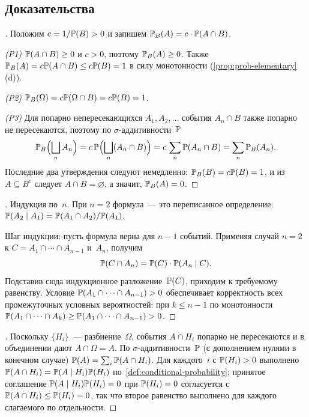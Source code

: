 \subsection*{Доказательства}

\begin{proof}[]
Положим $c = 1/\mathbb{P}(B) > 0$ и запишем $\mathbb{P}_B(A) = c \cdot \mathbb{P}(A \cap B)$.

\emph{(P1)} $\mathbb{P}(A \cap B) \geq 0$ и $c > 0$, поэтому $\mathbb{P}_B(A) \geq 0$. Также $\mathbb{P}_B(A) = c \mathbb{P}(A \cap B) \leq c \mathbb{P}(B) = 1$ в силу монотонности (\cref{prop:prob-elementary}\,(d)).

\emph{(P2)} $\mathbb{P}_B(\Omega) = c \mathbb{P}(\Omega \cap B) = c \mathbb{P}(B) = 1$.

\emph{(P3)} Для попарно непересекающихся $A_1, A_2, \dots$ события $A_n \cap B$ также попарно не пересекаются, поэтому по $\sigma$-аддитивности~$\mathbb{P}$
\[
  \mathbb{P}_B\Bigl(\bigsqcup_n A_n\Bigr) = c\, \mathbb{P}\Bigl(\bigsqcup_n (A_n \cap B)\Bigr) = c\, \sum_n \mathbb{P}(A_n \cap B) = \sum_n \mathbb{P}_B(A_n).
\]
Последние два утверждения следуют немедленно: $\mathbb{P}_B(B) = c \mathbb{P}(B) = 1$, и из $A \subseteq B^c$ следует $A \cap B = \varnothing$, а значит, $\mathbb{P}_B(A) = 0$.
\end{proof}

\begin{proof}[]
Индукция по~$n$. При $n = 2$ формула~--- это переписанное определение: $\mathbb{P}(A_2 \mid A_1) = \mathbb{P}(A_1 \cap A_2) / \mathbb{P}(A_1)$.

Шаг индукции: пусть формула верна для $n - 1$ событий. Применяя случай $n = 2$ к $C = A_1 \cap \cdots \cap A_{n-1}$ и~$A_n$, получим
\[
  \mathbb{P}(C \cap A_n) = \mathbb{P}(C) \cdot \mathbb{P}(A_n \mid C).
\]
Подставив сюда индукционное разложение~$\mathbb{P}(C)$, приходим к требуемому равенству. Условие $\mathbb{P}(A_1 \cap \cdots \cap A_{n-1}) > 0$ обеспечивает корректность всех промежуточных условных вероятностей: при $k \leq n - 1$ по монотонности $\mathbb{P}(A_1 \cap \cdots \cap A_k) \geq \mathbb{P}(A_1 \cap \cdots \cap A_{n-1}) > 0$.
\end{proof}

\begin{proof}[]
Поскольку $\{H_i\}$~--- разбиение~$\Omega$, события $A \cap H_i$ попарно не пересекаются и в объединении дают $A \cap \Omega = A$. По $\sigma$-аддитивности~$\mathbb{P}$ (с дополнением нулями в конечном случае) $\mathbb{P}(A) = \sum_i \mathbb{P}(A \cap H_i)$. Для каждого~$i$ с $\mathbb{P}(H_i) > 0$ выполнено $\mathbb{P}(A \cap H_i) = \mathbb{P}(A \mid H_i) \mathbb{P}(H_i)$ по~\cref{def:conditional-probability}; принятое соглашение $\mathbb{P}(A \mid H_i) \mathbb{P}(H_i) = 0$ при $\mathbb{P}(H_i) = 0$ согласуется с $\mathbb{P}(A \cap H_i) \leq \mathbb{P}(H_i) = 0$, так что второе равенство выполнено для каждого слагаемого по отдельности.
\end{proof}

